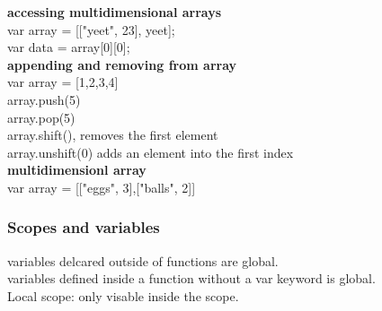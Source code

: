 \textbf{accessing multidimensional arrays}\\
var array = [["yeet", 23], yeet];\\
var data = array[0][0];\\

\textbf{appending and removing from array}\\
var array = [1,2,3,4]\\
array.push(5)\\
array.pop(5)\\
array.shift(), removes the first element\\
array.unshift(0) adds an element into the first index\\

\textbf{multidimensionl array}\\
var array = [["eggs", 3],["balls", 2]]

\subsubsection{Scopes and variables}
variables delcared outside of functions are global.\\
variables defined inside a function without a var keyword is global.\\

Local scope: only visable inside the scope.\\ 






